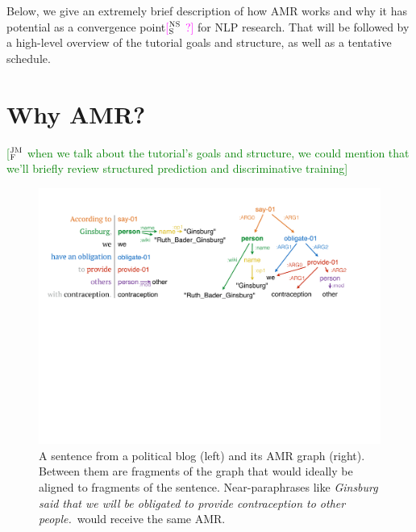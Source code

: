 \documentclass[11pt,letterpaper]{article}
\newcommand{\ensuretext}[1]{#1}
\newcommand{\jmfmarker}{\ensuretext{\textcolor{green}{\ensuremath{^{\textsc{JM}}_{\textsc{F}}}}}}
\newcommand{\nssmarker}{\ensuretext{\textcolor{magenta}{\ensuremath{^{\textsc{NS}}_{\textsc{S}}}}}}
\newcommand{\arkcomment}[3]{\ensuretext{\textcolor{#3}{[#1 #2]}}}
\newcommand{\jmf}[1]{\arkcomment{\jmfmarker}{#1}{green}}
\newcommand{\nss}[1]{\arkcomment{\nssmarker}{#1}{magenta}}
\begin{document}
Below, we give an extremely brief description of how AMR works and why it has potential 
as a convergence point\nss{?} for NLP research. 
That will be followed by a high-level overview of the tutorial goals and structure, 
as well as a tentative schedule.

\section{Why AMR?}


\jmf{when we talk about the tutorial's goals and structure, we could mention that we'll briefly review structured prediction and discriminative training}

\begin{figure}\centering
\includegraphics[width=.87\textwidth]{ginsburg.pdf}
\caption{A sentence from a political blog (left) and its AMR graph (right). 
Between them are fragments of the graph that would ideally be aligned to fragments of the sentence. 
Near-paraphrases like \textit{Ginsburg said that we will be obligated to provide contraception to other people.}\ 
would receive the same AMR.}
\label{fig:ginsburg}
\end{figure}
\end{document}
